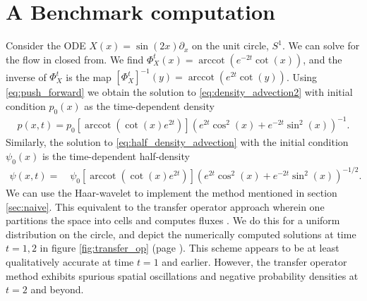 \documentclass[a4paper, 12 pt]{amsart}
\DeclareMathOperator{\arccot}{arccot}
\begin{document}
\section{A Benchmark computation}
Consider the ODE $X(x) = \sin(2x) \partial_x$ on the unit circle, $S^1$.
We can solve for the flow in closed from.  We find
$\Phi_X^t(x) = \arccot( e^{-2t} \cot(x) )$,
 and the inverse of $\Phi_X^t$ is the map $[\Phi_X^t]^{-1}(y) = \arccot( e^{2t} \cot(y) )$.
Using \eqref{eq:push_forward}
we obtain the solution to \eqref{eq:density_advection2} with initial condition $p_0(x)$ as the time-dependent density
\begin{align}
  p(x,t) = p_0\left[ \arccot \left( \cot(x)e^{2t} \right)\right]
  \left( e^{2t} \cos^2(x) + e^{-2t} \sin^2(x)  \right)^{-1}. \label{eq:benchmark}
\end{align}
Similarly, the solution to \eqref{eq:half_density_advection} with the initial condition $\psi_0(x)$ is the time-dependent half-density
\begin{align*}
  \psi(x,t) =  \quad \psi_0\left[\arccot\left( \cot(x)e^{2t} \right) \right]
  \left( e^{2t} \cos^2(x) + e^{-2t} \sin^2(x) \right)^{-1/2}. 
\end{align*}
We can use the Haar-wavelet to implement the method mentioned in section \ref{sec:naive}.
This equivalent to the transfer operator approach wherein one partitions the space into cells and computes fluxes \cite{FroylandJungeKoltai2013}.
We do this for a uniform distribution on the circle, and depict the numerically computed solutions at time $t=1,2$ in figure \ref{fig:transfer_op} (page \pageref{fig:transfer_op}).
This scheme appears to be at least qualitatively accurate at time $t=1$ and earlier.
However, the transfer operator method exhibits spurious spatial oscillations and negative probability densities at $t=2$ and beyond.
\end{document}
